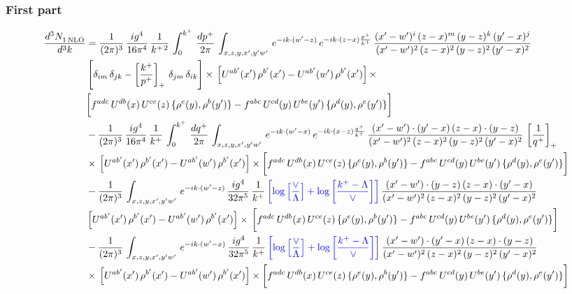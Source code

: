 \documentclass[9pt]{article}
\numberwithin{equation}{section}
\begin{document}
\subsubsection*{First part}
\begin{align}
     \frac{d^{3}N_{1\,\rm NLO}^{\rm}}{d^{3}k}  & = \frac{1}{(2\pi)^{3}}\, \frac{ig^{4}}{16\pi^{4}}\, \frac{1}{k^{+\,2}}\,\int_{0}^{k^{+}}\, \frac{dp^{+}}{2\pi}\,\int_{x,z,y,x',y'w'}\,e^{-ik\cdot (w^\prime-z)}\,e^{-ik\cdot (z-x)\frac{p^{+}}{k^{+}}}\,\frac{(x'-w')^{i}\,(z-x)^{m}\,(y-z)^{k}\,(y'-x)^{j}}{(x'-w')^{2}\,(z-x)^{2}\,(y-z)^{2}\,(y'-x)^{2}}\,\notag \\ & \left[\delta_{im}\,\delta_{jk}-\left[\frac{k^{+}}{p^{+}}\right]_{+}\, \delta_{jm}\,\delta_{ik}\right]\times\, \left[U^{ab'}(x')\,\rho^{b'}(x')-U^{ab'}(w')\,\rho^{b'}(x')\right]\times\notag \\ & \bigg[f^{adc}\,U^{db}(x)\,U^{ce}(z)\, \{\rho^{e}(y),\rho^{b}(y')\}-f^{abc}\,U^{cd}(y)\,U^{be}(y')\, \{\rho^{d}(y),\rho^{e}(y')\}\bigg]\notag \\ & -\frac{1}{(2\pi)^{3}}\, \frac{ig^{4}}{16\pi^{4}}\, \frac{1}{k^{+}}\,\int_{0}^{k^{+}}\, \frac{dq^{+}}{2\pi}\,\int_{x,z,y,x',y'w'}\,e^{-ik\cdot (w^\prime-x)}\,e^{-ik\cdot (x-z)\frac{q^{+}}{k^{+}}}\,\frac{(x'-w')\cdot (y'-x)\,(z-x)\cdot (y-z)}{(x'-w')^{2}\,(z-x)^{2}\,(y-z)^{2}\,(y'-x)^{2}}\,\left[\frac{1}{q^{+}}\right]_{+}\notag \\ & \times\, \left[U^{ab'}(x')\,\rho^{b'}(x')-U^{ab'}(w')\,\rho^{b'}(x')\right]\times \bigg[f^{adc}\,U^{db}(x)\,U^{ce}(z)\, \{\rho^{e}(y),\rho^{b}(y')\}-f^{abc}\,U^{cd}(y)\,U^{be}(y')\, \{\rho^{d}(y),\rho^{e}(y')\}\bigg]\notag \\ & -\frac{1}{(2\pi)^{3}}\, \int_{x,z,y,x',y'w'}\,e^{-ik\cdot (w^\prime-z)}\,\frac{ig^{4}}{32\pi^{5}}\, \frac{1}{k^{+}}\,{\color{blue}\left[\log{\left[\frac{\vee}{\Lambda}\right]} + \log{\left[\frac{k^{+}-\Lambda}{\vee}\right]}\right]}\,\frac{(x'-w')\cdot (y-z)\,(z-x)\cdot (y'-x)}{(x'-w')^{2}\,(z-x)^{2}\,(y-z)^{2}\,(y'-x)^{2}}\,\notag \\ & \left[U^{ab'}(x')\,\rho^{b'}(x')-U^{ab'}(w')\,\rho^{b'}(x')\right]\times\, \bigg[f^{adc}\,U^{db}(x)\,U^{ce}(z)\, \{\rho^{e}(y),\rho^{b}(y')\}-f^{abc}\,U^{cd}(y)\,U^{be}(y')\, \{\rho^{d}(y),\rho^{e}(y')\}\bigg]\notag \\ &  -\frac{1}{(2\pi)^{3}}\, \int_{x,z,y,x',y'w'}\,e^{-ik\cdot (w^\prime-x)}\,\frac{ig^{4}}{32\pi^{5}}\, \frac{1}{k^{+}}\,{\color{blue}\left[\log{\left[\frac{\vee}{\Lambda}\right]} + \log{\left[\frac{k^{+}-\Lambda}{\vee}\right]}\right]}\,\frac{(x'-w')\cdot (y'-x)\,(z-x)\cdot (y-z)}{(x'-w')^{2}\,(z-x)^{2}\,(y-z)^{2}\,(y'-x)^{2}}\notag \\ & \times\, \left[U^{ab'}(x')\,\rho^{b'}(x')-U^{ab'}(w')\,\rho^{b'}(x')\right]\times \bigg[f^{adc}\,U^{db}(x)\,U^{ce}(z)\, \{\rho^{e}(y),\rho^{b}(y')\}-f^{abc}\,U^{cd}(y)\,U^{be}(y')\, \{\rho^{d}(y),\rho^{e}(y')\}\bigg]
\end{align}
\end{document}
